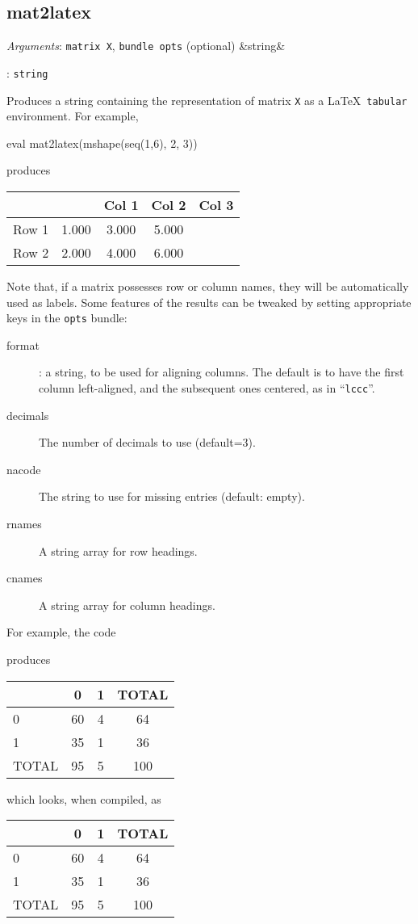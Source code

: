 \documentclass[11pt,english]{article}
\newcommand{\ArgRet}[2]{%
  {\it Arguments}: {#1}%
  \ifx&#2&%
  \else
  \par\smallskip\noindent {\it Return type}: \texttt{#2}
  \fi%
  \par\medskip\par%
  }
\begin{document}
\subsection{mat2latex}

\ArgRet{\texttt{matrix X}, \texttt{bundle opts} (optional)}{string}

Produces a string containing the representation of matrix \texttt{X}
as a \LaTeX\ \texttt{tabular} environment. For example,
\begin{code}
eval mat2latex(mshape(seq(1,6), 2, 3))
\end{code}
produces
\begin{code}
\begin{tabular}{lccc}
\hline
 &	  &	 Col 1  &	 Col 2  &	 Col 3 \\ \hline
Row 1 & 1.000	 & 3.000	 & 5.000 \\
Row 2 & 2.000	 & 4.000	 & 6.000 \\
\hline
\end{tabular}
\end{code}
Note that, if a matrix possesses row or column names, they will be
automatically used as labels. Some features of the results can be
tweaked by setting appropriate keys in the \texttt{opts} bundle:
\begin{description}
\item[format]: a string, to be used for aligning columns. The default
  is to have the first column left-aligned, and the subsequent ones
  centered, as in ``\texttt{lccc}''.
\item[decimals] The number of decimals to use (default=3).
\item[nacode] The string to use for missing entries (default: empty).
\item[rnames] A string array for row headings.
\item[cnames] A string array for column headings.
\end{description}

For example, the code
produces
\begin{code}
\begin{tabular}{lccc}
\hline
 &	   0  &	    1  &	 TOTAL \\ \hline
   0 & 60	 & 4	 & 64 \\
   1 & 35	 & 1	 & 36 \\
TOTAL & 95	 & 5	 & 100 \\
\hline
\end{tabular}
\end{code}
which looks, when compiled, as
\begin{center}
\begin{tabular}{lccc}
\hline
 &	   0  &	    1  &	 TOTAL \\ \hline
   0 & 60	 & 4	 & 64 \\
   1 & 35	 & 1	 & 36 \\
TOTAL & 95	 & 5	 & 100 \\
\hline
\end{tabular}
\end{center}
\end{document}
